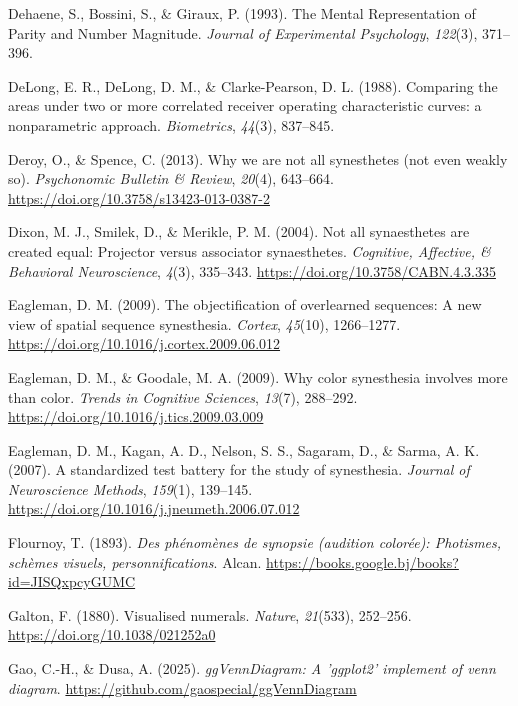 \documentclass[
  man,
  floatsintext,
  longtable,
  nolmodern,
  notxfonts,
  notimes,
  colorlinks=true,linkcolor=blue,citecolor=blue,urlcolor=blue]{apa7}
\newlength{\cslhangindent}
\newenvironment{CSLReferences}[2] %
 {\begin{list}{}{%
  \setlength{\itemindent}{0pt}
  \setlength{\leftmargin}{0pt}
  \setlength{\parsep}{0pt}
  \ifodd #1
   \setlength{\leftmargin}{\cslhangindent}
   \setlength{\itemindent}{-1\cslhangindent}
  \fi
  \setlength{\itemsep}{#2\baselineskip}}}
 {\end{list}}
\begin{document}
\begin{CSLReferences}{1}{0}
Dehaene, S., Bossini, S., \& Giraux, P. (1993). The Mental
Representation of Parity and Number Magnitude. \emph{Journal of
Experimental Psychology}, \emph{122}(3), 371--396.

DeLong, E. R., DeLong, D. M., \& Clarke-Pearson, D. L. (1988). Comparing
the areas under two or more correlated receiver operating characteristic
curves: a nonparametric approach. \emph{Biometrics}, \emph{44}(3),
837--845.

Deroy, O., \& Spence, C. (2013). Why we are not all synesthetes (not
even weakly so). \emph{Psychonomic Bulletin \& Review}, \emph{20}(4),
643--664. \url{https://doi.org/10.3758/s13423-013-0387-2}

Dixon, M. J., Smilek, D., \& Merikle, P. M. (2004). Not all synaesthetes
are created equal: Projector versus associator synaesthetes.
\emph{Cognitive, Affective, \& Behavioral Neuroscience}, \emph{4}(3),
335--343. \url{https://doi.org/10.3758/CABN.4.3.335}

Eagleman, D. M. (2009). The objectification of overlearned sequences: A
new view of spatial sequence synesthesia. \emph{Cortex}, \emph{45}(10),
1266--1277. \url{https://doi.org/10.1016/j.cortex.2009.06.012}

Eagleman, D. M., \& Goodale, M. A. (2009). Why color synesthesia
involves more than color. \emph{Trends in Cognitive Sciences},
\emph{13}(7), 288--292. \url{https://doi.org/10.1016/j.tics.2009.03.009}

Eagleman, D. M., Kagan, A. D., Nelson, S. S., Sagaram, D., \& Sarma, A.
K. (2007). A standardized test battery for the study of synesthesia.
\emph{Journal of Neuroscience Methods}, \emph{159}(1), 139--145.
\url{https://doi.org/10.1016/j.jneumeth.2006.07.012}

Flournoy, T. (1893). \emph{Des phénomènes de synopsie (audition
colorée): Photismes, schèmes visuels, personnifications}. Alcan.
\url{https://books.google.bj/books?id=JISQxpcyGUMC}

Galton, F. (1880). Visualised numerals. \emph{Nature}, \emph{21}(533),
252--256. \url{https://doi.org/10.1038/021252a0}

Gao, C.-H., \& Dusa, A. (2025). \emph{{ggVennDiagram}: A 'ggplot2'
implement of venn diagram}.
\url{https://github.com/gaospecial/ggVennDiagram}


\end{CSLReferences}
\end{document}
